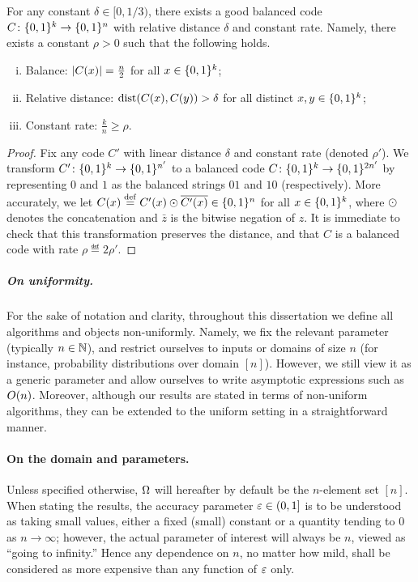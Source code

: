 \begin{proposition}\label{lemma:good:balanced:hamming:codes}
  For any constant $\delta \in [0,1/3)$, there exists a good balanced code $C\colon \{0,1\}^k \to \{0,1\}^n$ with relative distance $\delta$ and constant rate. Namely, there exists a constant $\rho>0$ such that the following holds.
  \begin{enumerate}[(i)]
    \item Balance: $\left\lvert C(x) \right\rvert = \frac{n}{2}$ for all $x\in \{0,1\}^k$;
    \item Relative distance: $\dist{C(x)}{C(y)} > \delta$ for all distinct $x,y\in \{0,1\}^k$;
    \item Constant rate: $\frac{k}{n} \geq \rho$.
  \end{enumerate}
\end{proposition}
\begin{proof}
  Fix any code $C'$ with linear distance $\delta$ and constant rate (denoted $\rho'$). We transform $C'\colon \{0,1\}^k \to \{0,1\}^{n'}$ to a balanced code $C\colon \{0,1\}^k \to \{0,1\}^{2n'}$ by representing $0$ and $1$ as the balanced strings $01$ and $10$ (respectively). More accurately, we let $C(x) \stackrel{\rm def}{=} C'(x)\odot\overline{C'(x)}\in\{0,1\}^n$ for all $x\in\{0,1\}^k$, where  $\odot$ denotes the concatenation and $\bar{z}$ is the bitwise negation of $z$. It is immediate to check that this transformation preserves the distance, and that $C$ is a balanced code with rate $\rho\eqdef 2\rho'$.
\end{proof}


\subparagraph{On uniformity.} For the sake of notation and clarity, throughout this dissertation we define all algorithms and objects non-uniformly. Namely, we fix the relevant parameter (typically $n\in\mathbb{N}$), and restrict ourselves to inputs or domains of size $n$ (for instance, probability distributions over domain $[n]$). However, we still view it as a generic parameter and allow ourselves to write asymptotic expressions such as $\bigO{n}$. Moreover, although our results are stated in terms of non-uniform algorithms, they can be extended to the uniform setting in a straightforward manner.

\paragraph{On the domain and parameters.} Unless specified otherwise, ${\Omega}$ will hereafter by default be the $n$-element set $[n]$. When stating the results, the accuracy parameter $\varepsilon\in(0,1]$ is to be understood as taking small values, either a fixed (small) constant or a quantity tending to $0$ as $n\to\infty$; however, the actual parameter of interest will always be $n$, viewed as ``going to infinity.'' Hence any dependence on $n$, no matter how mild, shall be considered as more expensive than any function of $\varepsilon$ only.

